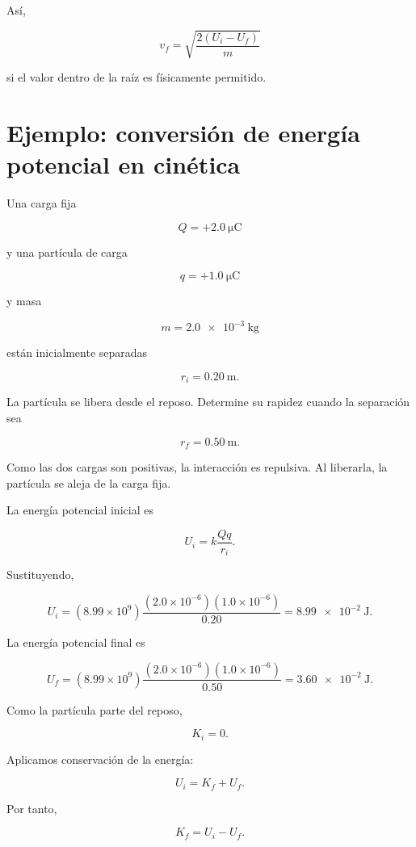 Así,

\begin{equation}
\boxed{
v_f=
\sqrt{\frac{2(U_i-U_f)}{m}}
}
\label{eq:velocidad_final_electrica}
\end{equation}

si el valor dentro de la raíz es físicamente permitido.


\section{Ejemplo: conversión de energía potencial en cinética}

\begin{ejemplo}

Una carga fija

\[
Q=+\SI{2.0}{\micro\coulomb}
\]

y una partícula de carga

\[
q=+\SI{1.0}{\micro\coulomb}
\]

y masa

\[
m=\SI{2.0e-3}{\kilogram}
\]

están inicialmente separadas

\[
r_i=\SI{0.20}{\metre}.
\]

La partícula se libera desde el reposo. Determine su rapidez cuando la separación
sea

\[
r_f=\SI{0.50}{\metre}.
\]

\end{ejemplo}

Como las dos cargas son positivas, la interacción es repulsiva. Al liberarla, la
partícula se aleja de la carga fija.

La energía potencial inicial es

\[
U_i=k\frac{Qq}{r_i}.
\]

Sustituyendo,

\[
U_i
=
(8.99\times10^9)
\frac{(2.0\times10^{-6})(1.0\times10^{-6})}{0.20}
=
\SI{8.99e-2}{\joule}.
\]

La energía potencial final es

\[
U_f
=
(8.99\times10^9)
\frac{(2.0\times10^{-6})(1.0\times10^{-6})}{0.50}
=
\SI{3.60e-2}{\joule}.
\]

Como la partícula parte del reposo,

\[
K_i=0.
\]

Aplicamos conservación de la energía:

\[
U_i=K_f+U_f.
\]

Por tanto,

\[
K_f=U_i-U_f.
\]

